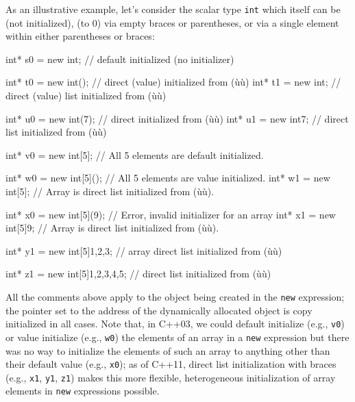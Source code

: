 As an illustrative example, let's consider the scalar type \lstinline!int!
which itself can be  (not initialized),
 (to 0) via empty braces or parentheses, or
 via a single element within either
parentheses or braces:

\begin{emcppslisting}
int* s0  = new int;               // default initialized (no initializer)

int* t0 = new int();              // direct (value) initialized from (ù{\codeincomments{()}}ù)
int* t1 = new int{};              // direct (value) list initialized from (ù{\codeincomments{\{\}}}ù)

int* u0 = new int(7);             // direct initialized from (ù{}ù)
int* u1 = new int{7};             // direct list initialized from (ù{}ù)

int* v0 = new int[5];             // All 5 elements are default initialized.

int* w0 = new int[5]();           // All 5 elements are value initialized.
int* w1 = new int[5]{};           // Array is direct list initialized from (ù{\codeincomments{\{\}}}ù).

int* x0 = new int[5](9);          // Error, invalid initializer for an array
int* x1 = new int[5]{9};          // Array is direct list initialized from (ù{}ù).

int* y1 = new int[5]{1,2,3};      // array direct list initialized from (ù{}ù)

int* z1 = new int[5]{1,2,3,4,5};  // direct list initialized from (ù{}ù)
\end{emcppslisting}
    

\noindent All the comments above apply to the object being created in the
\lstinline!new! expression; the pointer set to the address of the
dynamically allocated object is copy initialized in all cases. Note
that, in C++03, we could default initialize (e.g., \lstinline!v0!) or value
initialize (e.g., \lstinline!w0!) the elements of an array in a
\lstinline!new! expression but there was no way to initialize the elements
of such an array to anything other than their default value (e.g.,
\lstinline!x0!); as of C++11, direct list initialization with braces (e.g.,
\lstinline!x1!, \lstinline!y1!, \lstinline!z1!) makes this more flexible,
heterogeneous initialization of array elements in \lstinline!new!
expressions possible.

